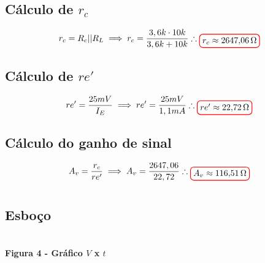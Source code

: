 \documentclass[12pt,openany,oneside,a4paper]{abntex2}
\begin{document}
\section{}

\subsection{Cálculo de $r_{c}$}
\[
r_{c} = R_{c} || R_{L} \implies r_{c} = \frac{3,6k \cdot 10k}{3,6k + 10k} \therefore \tikz[baseline]{\node[draw=red, thick, rounded corners] {$r_{c} \approx 2647{,}06\,\Omega$};}
\]

\subsection{Cálculo de $re'$}
\[
re' = \frac{25mV}{I_{E}} \implies re' = \frac{25mV}{1,1mA} \therefore \tikz[baseline]{\node[draw=red, thick, rounded corners] {$re' \approx 22{,}72\,\Omega$};}
\]

\subsection{Cálculo do ganho de sinal}
\[
A_{v} = \frac{r_{c}}{re'} \implies A_{v} = \frac{2647,06}{22,72} \therefore \tikz[baseline]{\node[draw=red, thick, rounded corners] {$A_{v} \approx 116{,}51\,\Omega$};}
\]

\section{}
\subsection{Esboço}
\begin{center}
\\
\large \textbf{Figura 4 - Gráfico $V$ x $t$}
\end{center}
\end{document}
